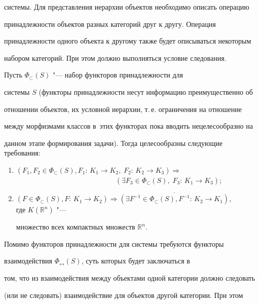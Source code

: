 системы. Для представления иерархии объектов необходимо описать операцию

принадлежности объектов разных категорий друг к другу. Операция

принадлежности одного объекта к другому также будет описываться некоторым

набором категорий. При этом должно выполняться условие следования.



Пусть $\Phi _\subset (S)$ "--- набор функторов принадлежности для

системы $S$ (функторы принадлежности несут информацию преимущественно об

отношении объектов, их условной иерархии, т.\,е. ограничения на отношение

между морфизмами классов в~этих функторах пока вводить нецелесообразно на

данном этапе формирования задачи). Тогда целесообразны следующие требования:

\begin{enumerate}

 \item  $(F_1 , F_2 \in \Phi _\subset (S), F_1 {:}\, K_1 \to K_2,\;  F_2 {:}\, K_2 \to K_3 )\Rightarrow $ \\

${\qquad}\qquad\qquad\qquad\qquad\qquad\qquad( \exists F_3 \in \Phi_\subset (S), \; {F_3 {:}\, K_1 \to K_3 } )$;

\item $( F\in \Phi _\subset (S), F{:}\,K_1 \to K_2 )\Rightarrow

\overline {

( \exists F^{-1}\in \Phi _\subset (S), F^{-1}{:}\,K_2 \to K_1  )

} $,\\ где $K( \mathbb R^n)$ "---

множество всех компактных множеств $\mathbb R^n$.



\end{enumerate}



Помимо функторов принадлежности для системы требуются функторы

взаимодействия $\Phi_{\leftrightarrow }(S)$, суть которых будет заключаться в

том, что из взаимодействия между объектами одной категории должно следовать

(или не следовать) взаимодействие для объектов другой категории. При этом

